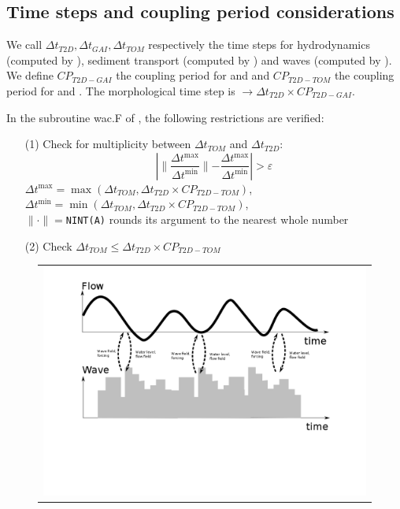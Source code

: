 \subsection{Time steps and coupling period considerations}
We call $\Delta t_{T2D}, \Delta t_{GAI}, \Delta t_{TOM}$ respectively the time steps for hydrodynamics (computed by ), sediment transport (computed by \gaia{}) and waves (computed by \tomawac{}). We define $CP_{T2D-GAI}$ the coupling period for  and \gaia{} and $CP_{T2D-TOM}$ the coupling period for  and \tomawac{}. The morphological time step is $\rightarrow \Delta t_{T2D} \times CP_{T2D-GAI}$.


In the subroutine {\ttfamily wac.F} of \tomawac{}, the following restrictions are verified:
\begin{itemize}
\item[(1)] Check for multiplicity between $\Delta t_{TOM}$ and $\Delta t_{T2D}$:
\begin{equation*}
\left|\parallel\frac{\Delta t^{\max}}{\Delta t^{\min}}\parallel-\frac{\Delta t^{\max}}{\Delta t^{\min}}\right|>\varepsilon %
\end{equation*}
$\Delta t^{\max}=\max{(\Delta t_{TOM}, \Delta t_{T2D} \times CP_{T2D-TOM})}$, $\Delta t^{\min}=\min{(\Delta t_{TOM}, \Delta t_{T2D} \times CP_{T2D-TOM})}$, \\
$\parallel\cdot\parallel=$\texttt{NINT(A)} rounds its argument to the nearest whole number
\item[(2)] Check $\Delta t_{TOM} \leq \Delta t_{T2D} \times CP_{T2D-TOM}$
\end{itemize}

\begin{figure}[H]%
  \begin{center}
    \begin{tabular}{c}
      \includegraphics[scale=0.30]{./graphics/coupling_1.png}
\end{tabular}
\end{center}
\end{figure}

